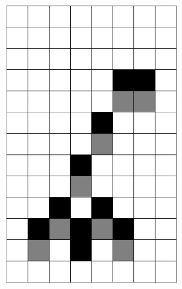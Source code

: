 \documentclass[12pt]{article}
\numberwithin{figure}{section} %
\begin{document}
\begin{figure}[H]
   	\setcounter{subfigure}{0}
         \begin{subfigure}{0.3\textwidth}
     		\centering
     		\includegraphics[angle=270,width=\linewidth]{Section4/13.0}
     		\subcaption{}
   	\end{subfigure}
     	\begin{subfigure}{0.3\textwidth}
     		\centering

\end{subfigure}
\end{figure}
\end{document}
